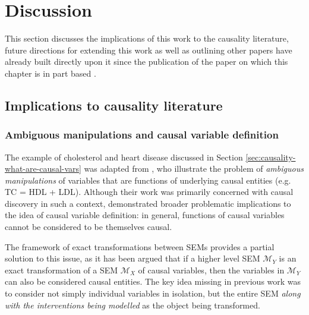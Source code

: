 \medskip






\section{Discussion}\label{sec:causality-discussion}

This section discusses the implications of this work to the causality literature, future directions for extending this work as well as outlining other papers have already built directly upon it since the publication of the paper on which this chapter is in part based \citep{rubenstein2017causal}.

\subsection{Implications to causality literature}

\subsubsection{Ambiguous manipulations and causal variable definition}
The example of cholesterol and heart disease discussed in Section \ref{sec:causality-what-are-causal-vars} was adapted from \cite{spirtes2004causal}, who illustrate the problem of \emph{ambiguous manipulations} of variables that are functions of underlying causal entities (e.g. TC = HDL + LDL).
Although their work was primarily concerned with causal discovery in such a context, \cite{eberhardt2016green} demonstrated broader problematic implications to the idea of causal variable definition: in general, functions of causal variables cannot be considered to be themselves causal.

The framework of exact transformations between SEMs provides a partial solution to this issue, as it has been argued that if a higher level SEM $\mathcal{M}_Y$ is an exact transformation of a SEM $\mathcal{M}_X$ of causal variables, then the variables in $\mathcal{M}_Y$ can also be considered causal entities. 
The key idea missing in previous work was to consider not simply individual variables in isolation, but the entire SEM \emph{along with the interventions being modelled} as the object being transformed.


